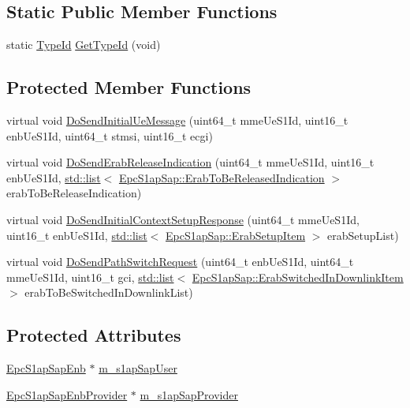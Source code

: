\subsection*{Static Public Member Functions}
\begin{DoxyCompactItemize}
\item 
static \hyperlink{classns3_1_1TypeId}{Type\+Id} \hyperlink{classns3_1_1EpcS1apEnb_a81106d7f55f5e73222ff647b995d80c9}{Get\+Type\+Id} (void)
\end{DoxyCompactItemize}
\subsection*{Protected Member Functions}
\begin{DoxyCompactItemize}
\item 
virtual void \hyperlink{classns3_1_1EpcS1apEnb_ae16bde90b51366725675d0bca74e6a57}{Do\+Send\+Initial\+Ue\+Message} (uint64\+\_\+t mme\+Ue\+S1\+Id, uint16\+\_\+t enb\+Ue\+S1\+Id, uint64\+\_\+t stmsi, uint16\+\_\+t ecgi)
\item 
virtual void \hyperlink{classns3_1_1EpcS1apEnb_afdba4b4f124cc6d046bbb22128b2e050}{Do\+Send\+Erab\+Release\+Indication} (uint64\+\_\+t mme\+Ue\+S1\+Id, uint16\+\_\+t enb\+Ue\+S1\+Id, \hyperlink{openflow-interface_8h_afd9bcfa176617760671b67580f536fa7}{std\+::list}$<$ \hyperlink{structns3_1_1EpcS1apSap_1_1ErabToBeReleasedIndication}{Epc\+S1ap\+Sap\+::\+Erab\+To\+Be\+Released\+Indication} $>$ erab\+To\+Be\+Release\+Indication)
\item 
virtual void \hyperlink{classns3_1_1EpcS1apEnb_a2c59c53e638bd97f1519eef27aadee50}{Do\+Send\+Initial\+Context\+Setup\+Response} (uint64\+\_\+t mme\+Ue\+S1\+Id, uint16\+\_\+t enb\+Ue\+S1\+Id, \hyperlink{openflow-interface_8h_afd9bcfa176617760671b67580f536fa7}{std\+::list}$<$ \hyperlink{structns3_1_1EpcS1apSap_1_1ErabSetupItem}{Epc\+S1ap\+Sap\+::\+Erab\+Setup\+Item} $>$ erab\+Setup\+List)
\item 
virtual void \hyperlink{classns3_1_1EpcS1apEnb_aa3aef472fe65763feed2e40cc5574438}{Do\+Send\+Path\+Switch\+Request} (uint64\+\_\+t enb\+Ue\+S1\+Id, uint64\+\_\+t mme\+Ue\+S1\+Id, uint16\+\_\+t gci, \hyperlink{openflow-interface_8h_afd9bcfa176617760671b67580f536fa7}{std\+::list}$<$ \hyperlink{structns3_1_1EpcS1apSap_1_1ErabSwitchedInDownlinkItem}{Epc\+S1ap\+Sap\+::\+Erab\+Switched\+In\+Downlink\+Item} $>$ erab\+To\+Be\+Switched\+In\+Downlink\+List)
\end{DoxyCompactItemize}
\subsection*{Protected Attributes}
\begin{DoxyCompactItemize}
\item 
\hyperlink{classns3_1_1EpcS1apSapEnb}{Epc\+S1ap\+Sap\+Enb} $\ast$ \hyperlink{classns3_1_1EpcS1apEnb_a6905f0d78d5d39dd5f6d521ec9615713}{m\+\_\+s1ap\+Sap\+User}
\item 
\hyperlink{classns3_1_1EpcS1apSapEnbProvider}{Epc\+S1ap\+Sap\+Enb\+Provider} $\ast$ \hyperlink{classns3_1_1EpcS1apEnb_ad8cce380561baf7c8463e34f090580cf}{m\+\_\+s1ap\+Sap\+Provider}
\end{DoxyCompactItemize}
